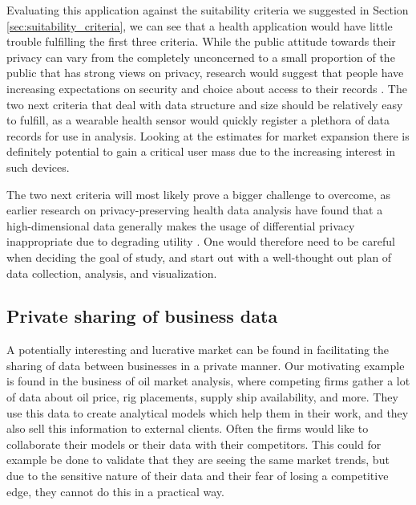 Evaluating this application against the suitability criteria we suggested in Section \ref{sec:suitability_criteria}, we can see that a health application would have little trouble fulfilling the first three criteria. While the public attitude towards their privacy can vary from the completely unconcerned to a small proportion of the public that has strong views on privacy, research would suggest that people have increasing expectations on security and choice about access to their records \citep{singleton2008public}. The two next criteria that deal with data structure and size should be relatively easy to fulfill, as a wearable health sensor would quickly register a plethora of data records for use in analysis. Looking at the estimates for market expansion there is definitely potential to gain a critical user mass due to the increasing interest in such devices.

The two next criteria will most likely prove a bigger challenge to overcome, as earlier research on privacy-preserving health data analysis have found that a high-dimensional data generally makes the usage of differential privacy inappropriate due to degrading utility \citep{gardner2013share,mohammed2013privacy}. One would therefore need to be careful when deciding the goal of study, and start out with a well-thought out plan of data collection, analysis, and visualization.  

%
%
%

\subsection{Private sharing of business data}
A potentially interesting and lucrative market can be found in facilitating the sharing of data between businesses in a private manner. Our motivating example is found in the business of oil market analysis, where competing firms gather a lot of data about oil price, rig placements, supply ship availability, and more. They use this data to create analytical models which help them in their work, and they also sell this information to external clients. Often the firms would like to collaborate their models or their data with their competitors. This could for example be done to validate that they are seeing the same market trends, but due to the sensitive nature of their data and their fear of losing a competitive edge, they cannot do this in a practical way. 

